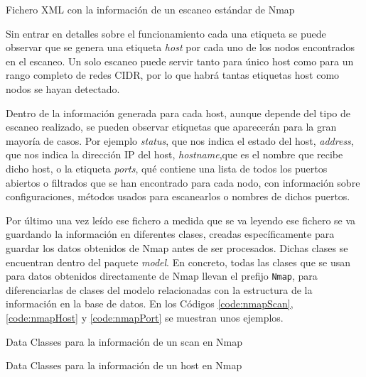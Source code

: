 \begin{code}
	\caption{Fichero XML con la información de un escaneo estándar de Nmap}
	\label{code:regular-scan}
	
\end{code}

Sin entrar en detalles sobre el funcionamiento cada una etiqueta se puede observar que se genera una etiqueta \textit{host} por cada uno de los nodos encontrados en el escaneo. Un solo escaneo puede servir tanto para único host como para un rango completo de redes CIDR, por lo que habrá tantas etiquetas host como nodos se hayan detectado.

Dentro de la información generada para cada host, aunque depende del tipo de escaneo realizado, se pueden observar etiquetas que aparecerán para la gran mayoría de casos. Por ejemplo \textit{status}, que nos indica el estado del host, \textit{address}, que nos indica la dirección IP del host, \textit{hostname},que es el nombre que recibe dicho host, o la etiqueta \textit{ports}, qué contiene una lista de todos los puertos abiertos o filtrados que se han encontrado para cada nodo, con información sobre configuraciones, métodos usados para escanearlos o nombres de dichos puertos.

Por último una vez leído ese fichero a medida que se va leyendo ese fichero se va guardando la información en diferentes clases, creadas específicamente para guardar los datos obtenidos de Nmap antes de ser procesados. Dichas clases se encuentran dentro del paquete \textit{model}. En concreto, todas las clases que se usan para datos obtenidos directamente de Nmap llevan el prefijo \texttt{Nmap}, para diferenciarlas de clases del modelo relacionadas con la estructura de la información en la base de datos. En los Códigos \ref{code:nmapScan}, \ref{code:nmapHost} y \ref{code:nmapPort} se muestran unos ejemplos.

\begin{code}
	\caption{Data Classes para la información de un scan en Nmap}
	\label{code:nmapScan}
	
\end{code}

\begin{code}
	\caption{Data Classes para la información de un host en Nmap}
	\label{code:nmapHost}
	
\end{code}

